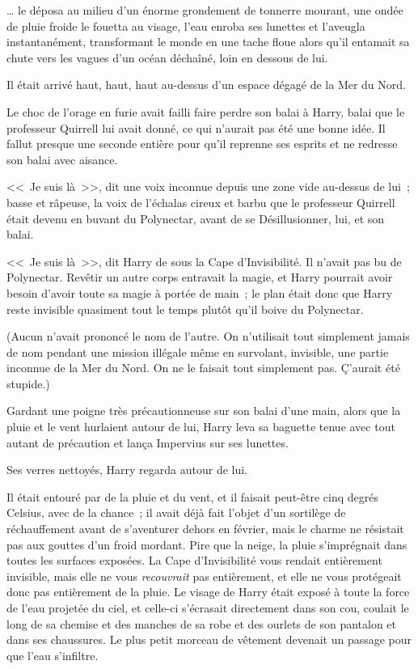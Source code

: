 … le déposa au milieu d'un énorme grondement de tonnerre mourant, une ondée de pluie froide le fouetta au visage, l'eau enroba ses lunettes et l'aveugla instantanément, transformant le monde en une tache floue alors qu'il entamait sa chute vers les vagues d'un océan déchaîné, loin en dessous de lui.

Il était arrivé haut, haut, haut au-dessus d'un espace dégagé de la Mer du Nord.

Le choc de l'orage en furie avait failli faire perdre son balai à Harry, balai que le professeur Quirrell lui avait donné, ce qui n'aurait pas été une bonne idée. Il fallut presque une seconde entière pour qu'il reprenne ses esprits et ne redresse son balai avec aisance.

<<~Je suis là~>>, dit une voix inconnue depuis une zone vide au-dessus de lui~; basse et râpeuse, la voix de l'échalas cireux et barbu que le professeur Quirrell était devenu en buvant du Polynectar, avant de se Désillusionner, lui, et son balai.

<<~Je suis là~>>, dit Harry de sous la Cape d'Invisibilité. Il n'avait pas bu de Polynectar. Revêtir un autre corps entravait la magie, et Harry pourrait avoir besoin d'avoir toute sa magie à portée de main~; le plan était donc que Harry reste invisible quasiment tout le temps plutôt qu'il boive du Polynectar.

(Aucun n'avait prononcé le nom de l'autre. On n'utilisait tout simplement jamais de nom pendant une mission illégale même en survolant, invisible, une partie inconnue de la Mer du Nord. On ne le faisait tout simplement pas. Ç'aurait été stupide.)

Gardant une poigne très précautionneuse sur son balai d'une main, alors que la pluie et le vent hurlaient autour de lui, Harry leva sa baguette tenue avec tout autant de précaution et lança Impervius sur ses lunettes.

Ses verres nettoyés, Harry regarda autour de lui.

Il était entouré par de la pluie et du vent, et il faisait peut-être cinq degrés Celsius, avec de la chance~; il avait déjà fait l'objet d'un sortilège de réchauffement avant de s'aventurer dehors en février, mais le charme ne résistait pas aux gouttes d'un froid mordant. Pire que la neige, la pluie s'imprégnait dans toutes les surfaces exposées. La Cape d'Invisibilité vous rendait entièrement invisible, mais elle ne vous \emph{recouvrait} pas entièrement, et elle ne vous protégeait donc pas entièrement de la pluie. Le visage de Harry était exposé à toute la force de l'eau projetée du ciel, et celle-ci s'écrasait directement dans son cou, coulait le long de sa chemise et des manches de sa robe et des ourlets de son pantalon et dans ses chaussures. Le plus petit morceau de vêtement devenait un passage pour que l'eau s'infiltre.

